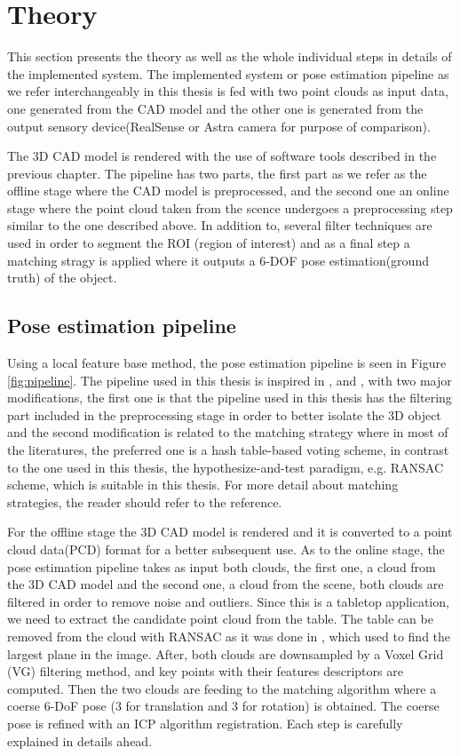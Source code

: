 
\chapter{Theory}
\label{chap:theo}
This section presents the theory as well as the whole individual steps in details of the implemented system. The implemented system or pose estimation pipeline as we refer interchangeably in this thesis is fed with two point clouds as input data, one generated from the CAD model and the other one is generated from the output sensory device(RealSense or Astra camera for purpose of comparison).

The 3D CAD model is rendered with the use of software tools described in the previous chapter. The pipeline has two parts, the first part as we refer as the offline stage where the CAD model is preprocessed, and the second one an online stage where the point cloud taken from the scence undergoes a preprocessing step similar to the one described above. In addition to, several filter techniques are used in order to segment the ROI (region of interest) and as a final step a matching stragy is applied where it outputs a 6-DOF pose estimation(ground truth) of the object.  

\section{Pose estimation pipeline}

Using a local feature base method, the pose estimation pipeline is seen in Figure \ref{fig:pipeline}. The pipeline used in this thesis is inspired in \cite{cadPipeline1}, \cite{cadPipeline2} and \cite{cadPipeline3}, with two major modifications, the first one is that the pipeline used in this thesis has the filtering part included in the preprocessing stage in order to better isolate the 3D object and the second modification is related to the matching strategy\cite{repMatching} where in most of the literatures, the preferred one is a hash table-based voting scheme, in contrast to the one used in this thesis, the hypothesize-and-test paradigm\cite{repMatching}, e.g. RANSAC scheme, which is suitable in this thesis. For more detail about matching strategies, the reader should refer to the reference. 


For the offline stage the 3D CAD model is rendered and it is converted to a point cloud data(PCD) format for a better subsequent use. As to the online stage, the pose estimation pipeline takes as input both clouds, the first one, a cloud from the 3D CAD model and the second one, a cloud from the scene, both clouds are filtered in order to remove noise and outliers. Since this is a tabletop application, we need to extract the candidate point cloud from the table. The table can be removed from the cloud with RANSAC as it was done in \cite{cadPipeline3}, which used to find the largest plane in the image. After, both clouds are downsampled by a Voxel Grid (VG) filtering method, and key points with their features descriptors are computed. Then the two clouds are feeding to the matching algorithm where a coerse 6-DoF pose (3 for translation and 3 for rotation) is obtained. The coerse pose is refined with an ICP algorithm registration. Each step is carefully explained in details ahead. 


